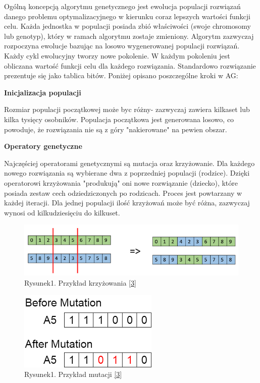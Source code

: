 \documentclass[a4paper, twoside, 12pt, justified]{article}
\begin{document}
	Ogólną koncepcją algorytmu genetycznego jest ewolucja populacji rozwiązań danego problemu optymalizacyjnego w kierunku coraz lepszych wartości funkcji celu. Każda jednostka w populacji posiada zbió właściwości (swoje chromosomy lub genotyp), który w ramach algorytmu zostaje zmieniony. Algorytm zazwyczaj rozpoczyna ewolucje bazując na losowo wygenerowanej populacji rozwiązań. Każdy cykl ewolucyjny tworzy nowe pokolenie. W każdym pokoleniu jest obliczana wartość funkcji celu dla każdego rozwiązania. Standardowo rozwiązanie prezentuje się jako tablica bitów. Poniżej opisano poszczególne kroki w AG:\\
	
	\begin{center}
		\textbf{Inicjalizacja populacji}
	\end{center}
	
	Rozmiar populacji początkowej może byc różny- zazwyczaj zawiera kilkaset lub kilka tysięcy osobników. Populacja początkowa jest generowana losowo, co powoduje, że rozwiązania nie są z góry "nakierowane" na pewien obszar.
	
	\begin{center}
		\textbf{Operatory genetyczne}
	\end{center}  
	
	Najczęściej operatorami genetycznymi są mutacja oraz krzyżowanie. Dla każdego nowego rozwiązania są wybierane dwa z poprzedniej populacji (rodzice). Dzięki operatorowi krzyżowania "produkują" oni nowe rozwiązanie (dziecko), które posiada zestaw cech odziedziczonych po rodzicach. Proces jest powtarzany w każdej iteracji. Dla jednej populacji ilość krzyżowań może być różna, zazwyczaj wynosi od kilkudziesięciu do kilkuset.
	
	\begin{figure}[h]
		\includegraphics[scale=1]{cross}
		\centering
		\\
		{Rysunek1. Przykład krzyżowania \hyperlink{cross}{[3]} } 
	\end{figure}

	\newpage

	\begin{figure}[h]
		\includegraphics[scale=1]{mutation}
		\centering
		\\
		{Rysunek1. Przykład mutacji \hyperlink{mutation}{[3]} } 
	\end{figure}
	
\end{document}
